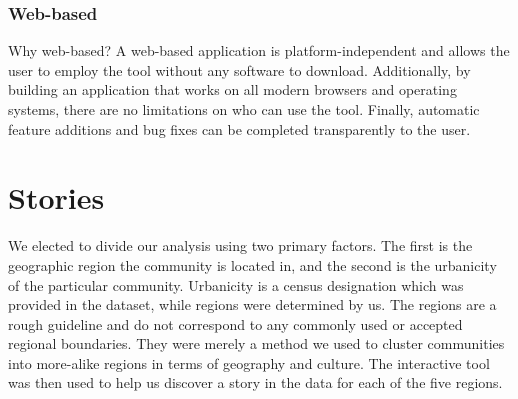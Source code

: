 \documentclass[11pt]{article}\usepackage{knitr}
\begin{document}
\subsubsection*{Web-based}
Why web-based? A web-based application is platform-independent and allows the user to employ the tool without any software to download. Additionally, by building an application that works on all modern browsers and operating systems, there are no limitations on who can use the tool. Finally, automatic feature additions and bug fixes can be completed transparently to the user.


\section*{Stories}

We elected to divide our analysis using two primary factors. The first is the geographic region the community is located in, and the second is the urbanicity of the particular community. Urbanicity is a census designation which was provided in the dataset, while regions were determined by us. The regions are a rough guideline and do not correspond to any commonly used or accepted regional boundaries. They were merely a method we used to cluster communities into more-alike regions in terms of geography and culture. The interactive tool was then used to help us discover a story in the data for each of the five regions.
\end{document}
